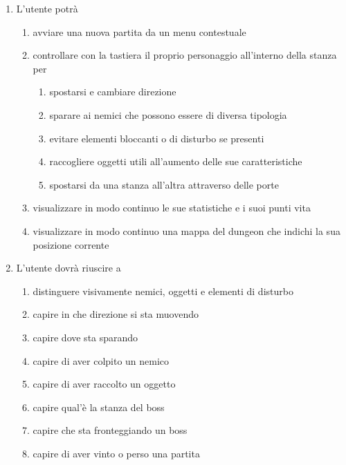 \begin{enumerate}
    \item L'utente potrà 
    \begin{enumerate}
        \item avviare una nuova partita da un menu contestuale
        \item controllare con la tastiera il proprio personaggio all'interno della stanza per
        \begin{enumerate}
            \item spostarsi e cambiare direzione
            \item sparare ai nemici che possono essere di diversa tipologia
            \item evitare elementi bloccanti o di disturbo se presenti
            \item raccogliere oggetti utili all'aumento delle sue caratteristiche
            \item spostarsi da una stanza all'altra attraverso delle porte
        \end{enumerate}
        \item visualizzare in modo continuo le sue statistiche e i suoi punti vita
        \item visualizzare in modo continuo una mappa del dungeon che indichi la sua posizione corrente
       
    \end{enumerate}
    \item L'utente dovrà riuscire a 
    \begin{enumerate}
        \item distinguere visivamente nemici, oggetti e elementi di disturbo
        \item capire in che direzione si sta muovendo
        \item capire dove sta sparando
        \item capire di aver colpito un nemico
        \item capire di aver raccolto un oggetto
        \item capire qual'è la stanza del boss
        \item capire che sta fronteggiando un boss
        \item capire di aver vinto o perso una partita
    \end{enumerate}
\end{enumerate}

